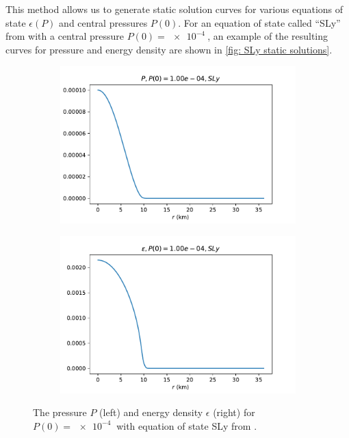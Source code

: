 This method allows us to generate static solution curves for various equations of state $\epsilon (P)$ and central pressures $P(0)$. For an equation of state called ``SLy'' from \autocite{SLy_2004} with a central pressure $P(0) = \SI{e-4}{}$, an example of the resulting curves for pressure and energy density are shown in \autoref{fig: SLy static solutions}.

\begin{figure}[h!]
    \centering
    \begin{subfigure}{.5\textwidth}
        \includegraphics[width=\textwidth]{images/tov/SLy_P,p00.0001.pdf}
    \end{subfigure}%
    \begin{subfigure}{.5\textwidth}
        \includegraphics[width=\textwidth]{images/tov/SLy_rho,p00.0001.pdf}
    \end{subfigure}
    \caption{The pressure $P$ (left) and energy density $\epsilon$ (right) for $P(0) = \SI{e-4}{}$ with equation of state SLy from \autocite{SLy_2004}.}
    \label{fig: SLy static solutions}
\end{figure}

